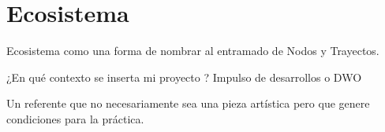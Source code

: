\section{Ecosistema}


Ecosistema como una forma de nombrar al entramado de Nodos y Trayectos. 

¿En qué contexto se inserta mi proyecto ? Impulso de desarrollos o DWO

Un referente que no necesariamente sea una pieza artística pero que genere condiciones para la práctica. 
